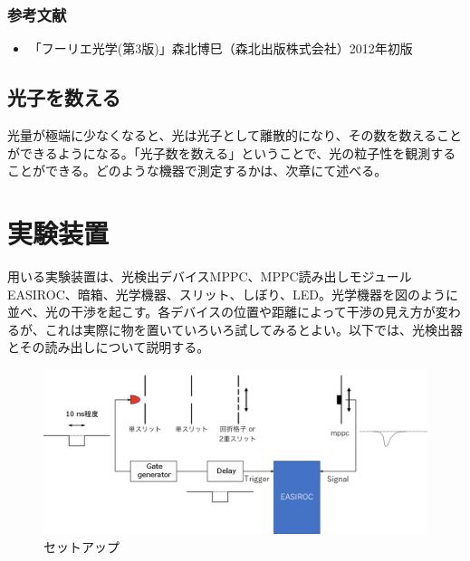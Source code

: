 \documentclass[10pt]{ujarticle}
\begin{document}
\subsubsection{参考文献}
\begin{itemize}
\item 「フーリエ光学(第3版)」森北博巳（森北出版株式会社）2012年初版
\end{itemize}
\clearpage


\subsection{光子を数える}
光量が極端に少なくなると、光は光子として離散的になり、その数を数えることができるようになる。「光子数を数える」ということで、光の粒子性を観測することができる。どのような機器で測定するかは、次章にて述べる。


\section{実験装置}
用いる実験装置は、光検出デバイスMPPC、MPPC読み出しモジュールEASIROC、暗箱、光学機器、スリット、しぼり、LED。光学機器を図のように並べ、光の干渉を起こす。各デバイスの位置や距離によって干渉の見え方が変わるが、これは実際に物を置いていろいろ試してみるとよい。以下では、光検出器とその読み出しについて説明する。
\begin{figure}[h]
\begin{center}
\includegraphics[width=12cm]{setup.png}
\end{center}
\caption{セットアップ}
\end{figure}
\end{document}
